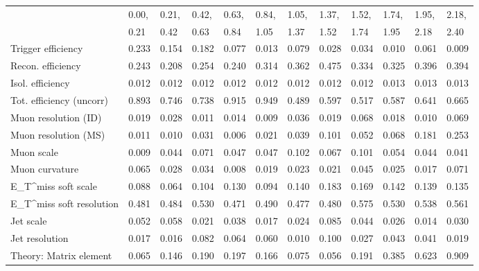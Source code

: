 \begin{tabular}{l|p{0.6cm}p{0.6cm}p{0.6cm}p{0.6cm}p{0.6cm}p{0.6cm}p{0.6cm}p{0.6cm}p{0.6cm}p{0.6cm}p{0.6cm}}
\hline
   & 0.00, & 0.21, & 0.42, & 0.63, & 0.84, & 1.05, & 1.37, & 1.52, & 1.74, & 1.95, & 2.18,  \\ 
   & 0.21 & 0.42 & 0.63 & 0.84 & 1.05 & 1.37 & 1.52 & 1.74 & 1.95 & 2.18 & 2.40  \\ 
\hline
Trigger efficiency                       & 0.233 & 0.154 & 0.182 & 0.077 & 0.013 & 0.079 & 0.028 & 0.034 & 0.010 & 0.061 & 0.009 \\
Recon. efficiency                        & 0.243 & 0.208 & 0.254 & 0.240 & 0.314 & 0.362 & 0.475 & 0.334 & 0.325 & 0.396 & 0.394 \\
Isol. efficiency                         & 0.012 & 0.012 & 0.012 & 0.012 & 0.012 & 0.012 & 0.012 & 0.012 & 0.013 & 0.013 & 0.013 \\
Tot. efficiency (uncorr)                 & 0.893 & 0.746 & 0.738 & 0.915 & 0.949 & 0.489 & 0.597 & 0.517 & 0.587 & 0.641 & 0.665 \\
Muon resolution (ID)                     & 0.019 & 0.028 & 0.011 & 0.014 & 0.009 & 0.036 & 0.019 & 0.068 & 0.018 & 0.010 & 0.069 \\
Muon resolution (MS)                     & 0.011 & 0.010 & 0.031 & 0.006 & 0.021 & 0.039 & 0.101 & 0.052 & 0.068 & 0.181 & 0.253 \\
Muon scale                               & 0.009 & 0.044 & 0.071 & 0.047 & 0.047 & 0.102 & 0.067 & 0.101 & 0.054 & 0.044 & 0.041 \\
Muon curvature                           & 0.065 & 0.028 & 0.034 & 0.008 & 0.019 & 0.023 & 0.021 & 0.045 & 0.025 & 0.017 & 0.071 \\
E_{T}^{miss} soft scale                  & 0.088 & 0.064 & 0.104 & 0.130 & 0.094 & 0.140 & 0.183 & 0.169 & 0.142 & 0.139 & 0.135 \\
E_{T}^{miss} soft resolution             & 0.481 & 0.484 & 0.530 & 0.471 & 0.490 & 0.477 & 0.480 & 0.575 & 0.530 & 0.538 & 0.561 \\
Jet scale                                & 0.052 & 0.058 & 0.021 & 0.038 & 0.017 & 0.024 & 0.085 & 0.044 & 0.026 & 0.014 & 0.030 \\
Jet resolution                           & 0.017 & 0.016 & 0.082 & 0.064 & 0.060 & 0.010 & 0.100 & 0.027 & 0.043 & 0.041 & 0.019 \\
Theory: Matrix element                   & 0.065 & 0.146 & 0.190 & 0.197 & 0.166 & 0.075 & 0.056 & 0.191 & 0.385 & 0.623 & 0.909 \\

\end{tabular}
